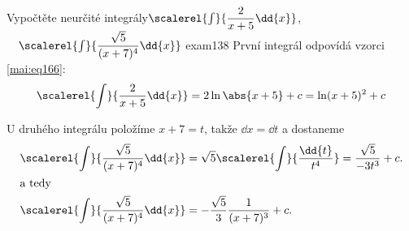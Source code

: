 \begin{mathexam}{Vypočtěte neurčité integrály\newline \(\scalerel{\int}{\dfrac{2}{x+5}\dd{x}}\),
  \(\quad\scalerel{\int}{\dfrac{\sqrt{5}}{(x+7)^4}\dd{x}}\) \hfill\cite[s.~71]{Knichal}}{exam138}
    První integrál odpovídá vzorci \ref{mai:eq166}:
    \begin{equation*}
      \scalerel{\int}{\dfrac{2}{x+5}\dd{x}} = 2\ln\abs{x+5} + c = \ln(x+5)^2 + c
    \end{equation*}

    U druhého integrálu položíme \(x+7 = t\), takže \(\dd{x} = \dd{t}\) a dostaneme
    \begin{align*}
      \scalerel{\int}{\dfrac{\sqrt{5}}{(x+7)^4}\dd{x}} &= 
      \sqrt{5}\scalerel{\int}{\dfrac{\dd{t}}{t^4}} = \dfrac{\sqrt{5}}{-3t^3} + c.   \\
      \shortintertext{a tedy}
      \scalerel{\int}{\dfrac{\sqrt{5}}{(x+7)^4}\dd{x}} &=-\dfrac{\sqrt{5}}{3}\dfrac{1}{(x+7)^3} + c.
    \end{align*}
\end{mathexam}